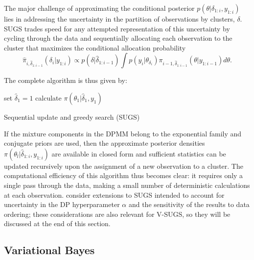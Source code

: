 \documentclass{uwstat572}
\begin{document}
The major challenge of approximating the conditional posterior $p(\theta | \delta_{1:i},y_{1:i})$ lies in addressing the uncertainty in the partition of observations by clusters, $\delta$. SUGS trades speed for any attempted representation of this uncertainty by cycling through the data and sequentially allocating each observation to the cluster that maximizes the conditional allocation probability
$$ \hat{\pi}_{i,\hat{\delta}_{1:i-1}}(\delta_i | y_{1:i}) \propto p(\delta | \hat{\delta}_{1:i-1}) \int p(y_i | \theta_{\delta_i}) \pi_{i-1,\hat{\delta}_{1:i-1}}(\theta | y_{1:i-1}) d\theta. $$

The complete algorithm is thus given by:
\medskip

\begin{algorithm}[H]
 set $\hat{\delta}_1 = 1$ \;
 calculate $\pi(\theta_1 | \hat{\delta}_1, y_1)$ \;
 \caption{Sequential update and greedy search (SUGS)}
\end{algorithm}

If the mixture components in the DPMM belong to the exponential family and conjugate priors are used, then the approximate posterior densities $\pi(\theta_l |  \hat{\delta}_{1:i},y_{1:i})$ are available in closed form and sufficient statistics can be updated recursively upon the assignment of a new observation to a cluster. The computational efficiency of this algorithm thus becomes clear: it requires only a single pass through the data, making a small number of deterministic calculations at each observation. \cite{wang} consider extensions to SUGS intended to account for uncertainty in the DP hyperparameter $\alpha$ and the sensitivity of the results to data ordering; these considerations are also relevant for V-SUGS, so they will be discussed at the end of this section.

\subsection{Variational Bayes}
\end{document}
